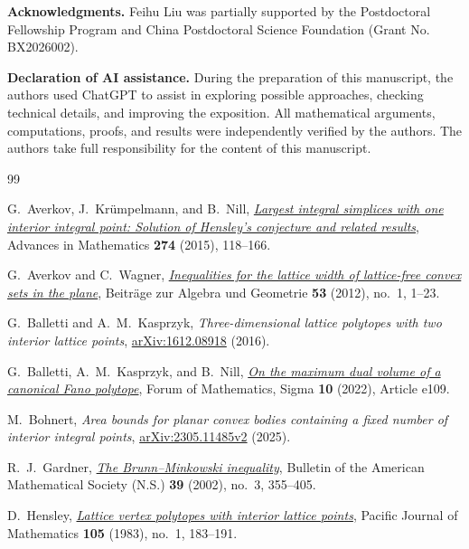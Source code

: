 \documentclass[reqno, 11pt]{article}
\numberwithin{equation}{section}
\theoremstyle{definition}
\begin{document}
\vspace{5mm}
\noindent
\textbf{Acknowledgments.}
Feihu Liu was partially supported by the Postdoctoral Fellowship Program and China Postdoctoral Science Foundation (Grant No. BX2026002).

\noindent\textbf{Declaration of AI assistance.}
During the preparation of this manuscript, the authors used ChatGPT to assist in exploring possible approaches, checking technical details, and improving the exposition. All mathematical arguments, computations, proofs, and results were independently verified by the authors. The authors take full responsibility for the content of this manuscript.


\begin{thebibliography}{99}

G.~Averkov, J.~Kr\"umpelmann, and B.~Nill,
\href{https://doi.org/10.1016/j.aim.2014.12.035}{\emph{Largest integral simplices with one interior integral point:
Solution of Hensley's conjecture and related results}},
Advances in Mathematics \textbf{274} (2015), 118--166.

G.~Averkov and C.~Wagner,
\href{https://doi.org/10.1007/s13366-011-0028-8}{\emph{Inequalities for the lattice width of lattice-free convex sets
in the plane}},
Beitr\"age zur Algebra und Geometrie \textbf{53} (2012), no.~1, 1--23.

G.~Balletti and A.~M.~Kasprzyk,
\emph{Three-dimensional lattice polytopes with two interior lattice points},
\href{https://arxiv.org/abs/1612.08918}{arXiv:1612.08918} (2016).

G.~Balletti, A.~M.~Kasprzyk, and B.~Nill,
\href{https://doi.org/10.1017/fms.2022.93}{\emph{On the maximum dual volume of a canonical Fano polytope}},
Forum of Mathematics, Sigma \textbf{10} (2022), Article e109.

M.~Bohnert,
\emph{Area bounds for planar convex bodies containing a fixed number
of interior integral points},
\href{https://arxiv.org/abs/2305.11485v2}{arXiv:2305.11485v2} (2025).

R.~J.~Gardner, \href{https://doi.org/10.1090/S0273-0979-02-00941-2}{\emph{The Brunn--Minkowski inequality}},
Bulletin of the American Mathematical Society (N.S.) \textbf{39}
(2002), no.~3, 355--405.

D.~Hensley, \href{https://msp.org/pjm/1983/105-1/pjm-v105-n1-p10-s.pdf}{\emph{Lattice vertex polytopes with interior lattice points}},
Pacific Journal of Mathematics \textbf{105} (1983), no.~1, 183--191.


\end{thebibliography}
\end{document}
